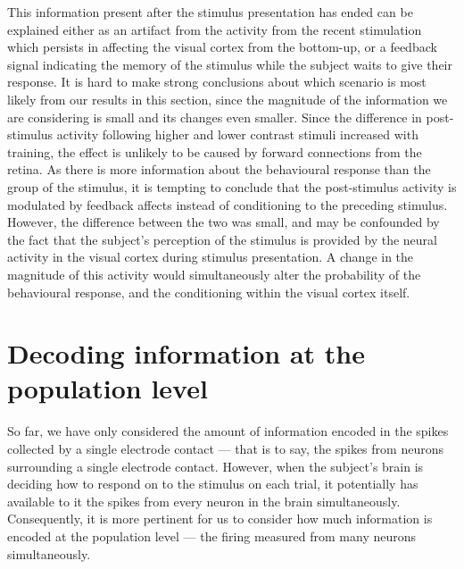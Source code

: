 This information present after the stimulus presentation has ended can be explained either as an artifact from the activity from the recent stimulation which persists in affecting the visual cortex from the bottom-up, or a feedback signal indicating the memory of the stimulus while the subject waits to give their response.
It is hard to make strong conclusions about which scenario is most likely from our results in this section, since the magnitude of the information we are considering is small and its changes even smaller.
Since the difference in post-stimulus activity following higher and lower contrast stimuli increased with training, the effect is unlikely to be caused by forward connections from the retina.
As there is more information about the behavioural response than the group of the stimulus, it is tempting to conclude that the post-stimulus activity is modulated by feedback affects instead of conditioning to the preceding stimulus.
However, the difference between the two was small, and may be confounded by the fact that the subject's perception of the stimulus is provided by the neural activity in the visual cortex during stimulus presentation.
A change in the magnitude of this activity would simultaneously alter the probability of the behavioural response, and the conditioning within the visual cortex itself.


\section{Decoding information at the population level}
\label{sec:dec-meth-lin}

So far, we have only considered the amount of information encoded in the spikes collected by a single electrode contact --- that is to say, the spikes from neurons surrounding a single electrode contact.
However, when the subject's brain is deciding how to respond on to the stimulus on each trial, it potentially has available to it the spikes from every neuron in the brain simultaneously.
Consequently, it is more pertinent for us to consider how much information is encoded at the population level --- the firing measured from many neurons simultaneously.


